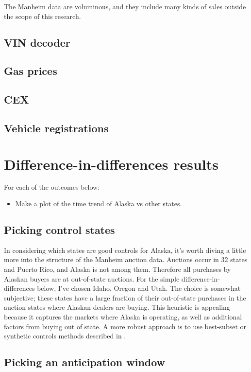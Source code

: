 \documentclass[11pt,letterpaper,oneside]{article}
\begin{document}
The Manheim data are voluminous, and they include many kinds of sales outside the scope of this research.

\subsection{VIN decoder}
\subsection{Gas prices}
\subsection{CEX}
\subsection{Vehicle registrations}


\section[DD Results]{Difference-in-differences results}

For each of the outcomes below:
\begin{itemize}
    \item Make a plot of the time trend of Alaska vs other states.
\end{itemize}


\subsection{Picking control states}
In considering which states are good controls for Alaska, it's worth diving a little more into the structure of the Manheim auction data.
Auctions occur in 32 states and Puerto Rico, and Alaska is not among them.
Therefore all purchases by Alaskan buyers are at out-of-state auctions.
For the simple difference-in-differences below, I've chosen Idaho, Oregon and Utah.
The choice is somewhat subjective; these states have a large fraction of their out-of-state purchases in the auction states where Alaskan dealers are buying.
This heuristic is appealing because it captures the markets where Alaska is operating, as well as additional factors from buying out of state.
A more robust approach is to use best-subset or synthetic controls methods described in \textcite{DoudchenkoImbens2016DD}.


\subsection{Picking an anticipation window}
\end{document}
